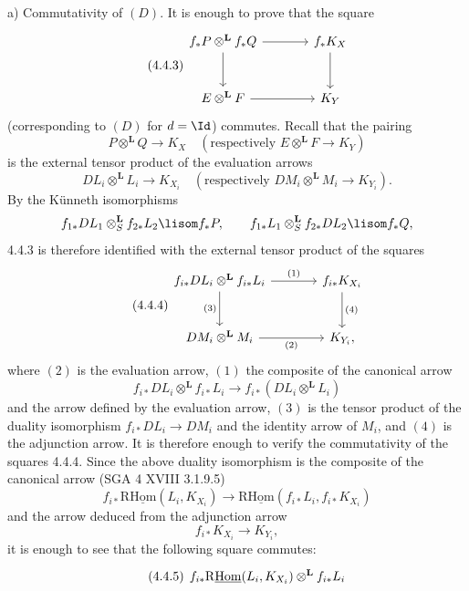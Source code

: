 \begin{prooftext}[Proof]
a) Commutativity of $(D)$. It is enough to prove that the square
\begin{equation}
\tag{4.4.3}
\begin{tikzcd}[column sep=large,row sep=large]
f_*P\otimes^{\mathbf L}f_*Q \arrow[r] \arrow[d] & f_*K_X \arrow[d]\\
E\otimes^{\mathbf L}F \arrow[r] & K_Y
\end{tikzcd}
\end{equation}
(corresponding to $(D)$ for $d=\Id$) commutes. Recall that the pairing
\[
P\otimes^{\mathbf L}Q\longrightarrow K_X
\quad(\text{respectively }E\otimes^{\mathbf L}F\longrightarrow K_Y)
\]
is the external tensor product of the evaluation arrows
\[
DL_i\otimes^{\mathbf L}L_i\longrightarrow K_{X_i}
\quad(\text{respectively }DM_i\otimes^{\mathbf L}M_i\longrightarrow K_{Y_i}).
\]
By the Künneth isomorphisms
\[
f_{1*}DL_1\otimes_S^{\mathbf L} f_{2*}L_2 \lisom f_*P,\qquad
f_{1*}L_1\otimes_S^{\mathbf L} f_{2*}DL_2 \lisom f_*Q,
\]
4.4.3 is therefore identified with the external tensor product of the squares
\begin{equation}
\tag{4.4.4}
\begin{tikzcd}[column sep=large,row sep=large]
f_{i*}DL_i\otimes^{\mathbf L} f_{i*}L_i
 \arrow[r,"(1)"] \arrow[d,"(3)"'] &
f_{i*}K_{X_i} \arrow[d,"(4)"]\\
DM_i\otimes^{\mathbf L}M_i \arrow[r,"(2)"'] & K_{Y_i},
\end{tikzcd}
\end{equation}
where $(2)$ is the evaluation arrow, $(1)$ the composite of the canonical arrow
\[
f_{i*}DL_i\otimes^{\mathbf L} f_{i*}L_i\longrightarrow f_{i*}(DL_i\otimes^{\mathbf L}L_i)
\]
and the arrow defined by the evaluation arrow, $(3)$ is the tensor product of the duality isomorphism $f_{i*}DL_i\longrightarrow DM_i$ and the identity arrow of $M_i$, and $(4)$ is the adjunction arrow. It is therefore enough to verify the commutativity of the squares 4.4.4. Since the above duality isomorphism is the composite of the canonical arrow (SGA 4 XVIII 3.1.9.5)
\[
f_{i*}\mathrm{R}\underline{\mathrm{Hom}}(L_i,K_{X_i})\longrightarrow \mathrm{R}\underline{\mathrm{Hom}}(f_{i*}L_i,f_{i*}K_{X_i})
\]
and the arrow deduced from the adjunction arrow
\[
f_{i*}K_{X_i}\longrightarrow K_{Y_i},
\]
it is enough to see that the following square commutes:
\begin{equation}
\tag{4.4.5}
\begin{tikzcd}[column sep=large,row sep=large]
f_{i*}\mathrm{R}\underline{\mathrm{Hom}}(L_i,K_{X_i})\otimes^{\mathbf L} f_{i*}L_i

\end{tikzcd}
\end{equation}
\end{prooftext}
